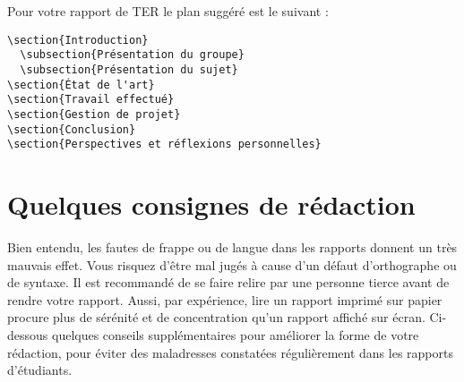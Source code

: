 \documentclass{rapport}
\begin{document}
        Pour votre rapport de TER le plan suggéré est le suivant :
        \begin{verbatim}\section{Introduction}
  \subsection{Présentation du groupe}
  \subsection{Présentation du sujet}
\section{État de l'art}
\section{Travail effectué}
\section{Gestion de projet}
\section{Conclusion}
\section{Perspectives et réflexions personnelles}\end{verbatim}
    
    \section{Quelques consignes de rédaction} 
      Bien entendu, les fautes de frappe ou de langue dans les rapports donnent un très mauvais effet. Vous risquez d'être mal jugés à cause d'un défaut d'orthographe ou de syntaxe. Il est recommandé de se faire relire par une personne tierce avant de rendre votre rapport. Aussi, par expérience, lire un rapport imprimé sur papier procure plus de sérénité et de concentration qu'un rapport affiché sur écran. Ci-dessous quelques conseils supplémentaires pour améliorer la forme de votre rédaction, pour éviter des maladresses constatées régulièrement dans les rapports d'étudiants.
      
\end{document}
